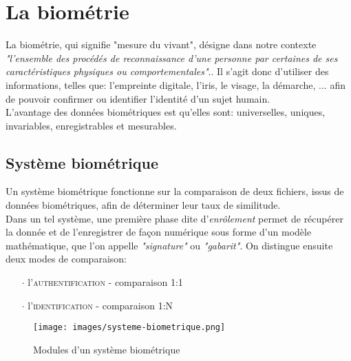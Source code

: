 \section{La biométrie}
La biométrie, qui signifie "mesure du vivant", désigne dans notre contexte \textit{"l'ensemble des procédés de reconnaissance d'une personne par certaines de ses caractéristiques physiques ou comportementales"}.\cite{Xmisc_3}. Il s'agit donc d'utiliser des informations, telles que: l'empreinte digitale, l'iris, le visage, la démarche, ... afin de pouvoir confirmer ou identifier l'identité d'un sujet humain.
\\
L'avantage des données biométriques est qu'elles sont: universelles, uniques, invariables, enregistrables et mesurables.

\subsection{Système biométrique}
Un système biométrique fonctionne sur la comparaison de deux fichiers, issus de données biométriques, afin de déterminer leur taux de similitude.
\\
Dans un tel système, une première phase dite d'\textit{enrôlement} permet de récupérer la donnée et de l'enregistrer de façon numérique sous forme d'un modèle mathématique, que l'on appelle \textit{"signature"} ou \textit{"gabarit"}. On distingue ensuite deux modes de comparaison: 
\begin{itemize}
\item[$\cdot$]l'\textsc{authentification} - comparaison 1:1
\item[$\cdot$]l'\textsc{identification} - comparaison 1:N
\end{itemize}
\begin{figure}[h!]
\texttt{[image: images/systeme-biometrique.png]}
\caption{Modules d'un système biométrique}
\end{figure}

